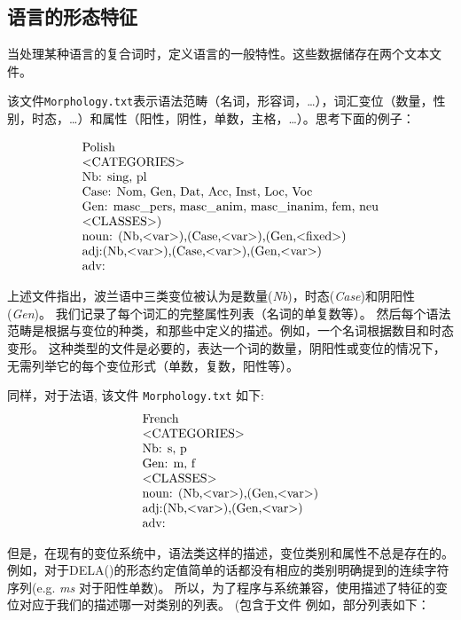 \subsection{语言的形态特征}
\label{subsec:langfeat}
当处理某种语言的复合词时，定义语言的一般特性。这些数据储存在两个文本文件。

\bigskip
\noindent 该文件\verb+Morphology.txt+表示语法范畴（名词，形容词，\dots），词汇变位（数量，性别，时态，\dots）和属性（阳性，阴性，单数，主格，\dots）。思考下面的例子：

\[
\begin{array}[c]{ll}
$Polish$ \\
$$<$CATEGORIES$>$$ \\
$Nb: sing, pl$ \\
$Case: Nom, Gen, Dat, Acc, Inst, Loc, Voc$ \\
$Gen: masc\_pers, masc\_anim, masc\_inanim, fem, neu$ \\
$$<$CLASSES$>$)$ \\
$noun: (Nb,$<$var$>$),(Case,$<$var$>$),(Gen,$<$fixed$>$)$ \\
$adj:(Nb,$<$var$>$),(Case,$<$var$>$),(Gen,$<$var$>$)$ \\
$adv:$
\end{array}
\]

\bigskip
\noindent 上述文件指出，波兰语中三类变位被认为是数量(\emph{Nb})，时态(\emph{Case})和阴阳性(\emph{Gen})。
我们记录了每个词汇的完整属性列表（名词的单复数等）。
然后每个语法范畴是根据与变位的种类，和那些中定义的描述。例如，一个名词根据数目和时态变形。
这种类型的文件是必要的，表达一个词的数量，阴阳性或变位的情况下，无需列举它的每个变位形式（单数，复数，阳性等）。

\bigskip
\noindent 同样，对于法语, 该文件 \verb+Morphology.txt+ 如下:
\[
\begin{array}[c]{l}
$French$ \\
$$<$CATEGORIES$>$$ \\
$Nb: s, p$ \\
$Gen: m, f$ \\
$$<$CLASSES$>$$\\
$noun: (Nb,$<$var$>$),(Gen,$<$var$>$)$ \\
$adj:(Nb,$<$var$>$),(Gen,$<$var$>$)$ \\
$adv:$
\end{array}
\]

\bigskip
\noindent 但是，在现有的变位系统中，语法类这样的描述，变位类别和属性不总是存在的。
例如，对于DELA(\cite{dicos-francais})的形态约定值简单的话都没有相应的类别明确提到的连续字符序列(e.g. \emph{ms} 对于阳性单数)。
所以，为了程序与系统兼容，使用描述了特征的变位对应于我们的描述哪一对类别的列表。
(包含于文件 
例如，部分列表如下：

